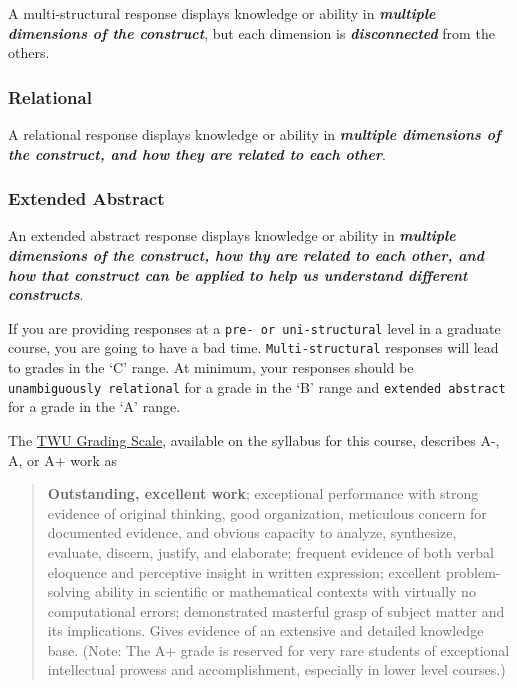\documentclass[
]{book}
\begin{document}
A multi-structural response displays knowledge or ability in \textbf{\emph{multiple dimensions of the construct}}, but each dimension is \textbf{\emph{disconnected}} from the others.

\hypertarget{relational}{%
\subsubsection*{Relational}\label{relational}}

A relational response displays knowledge or ability in \textbf{\emph{multiple dimensions of the construct, and how they are related to each other}}.

\hypertarget{extended-abstract}{%
\subsubsection*{Extended Abstract}\label{extended-abstract}}

An extended abstract response displays knowledge or ability in \textbf{\emph{multiple dimensions of the construct, how thy are related to each other, and how that construct can be applied to help us understand different constructs}}.

If you are providing responses at a \texttt{pre-\ or\ uni-structural} level in a graduate course, you are going to have a bad time. \texttt{Multi-structural} responses will lead to grades in the `C' range. At minimum, your responses should be \texttt{unambiguously\ relational} for a grade in the `B' range and \texttt{extended\ abstract} for a grade in the `A' range.

The \href{https://www.twu.ca/about/policies-guidelines/university-standard-grading-system}{TWU Grading Scale}, available on the syllabus for this course, describes A-, A, or A+ work as

\begin{quote}
\textbf{Outstanding, excellent work}; exceptional performance with strong evidence of original thinking, good organization, meticulous concern for documented evidence, and obvious capacity to analyze, synthesize, evaluate, discern, justify, and elaborate; frequent evidence of both verbal eloquence and perceptive insight in written expression; excellent problem-solving ability in scientific or mathematical contexts with virtually no computational errors; demonstrated masterful grasp of subject matter and its implications. Gives evidence of an extensive and detailed knowledge base. (Note: The A+ grade is reserved for very rare students of exceptional intellectual prowess and accomplishment, especially in lower level courses.)
\end{quote}
\end{document}
